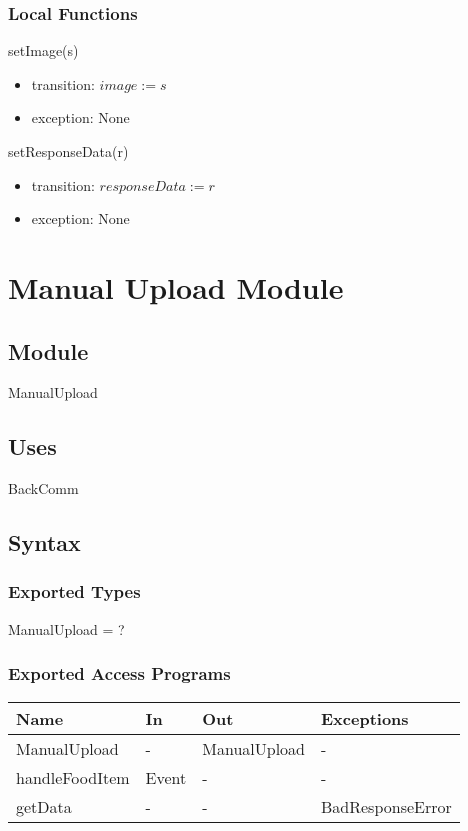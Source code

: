 \documentclass[12pt, titlepage]{article}
\begin{document}
\subsubsection{Local Functions}
\noindent setImage(s)
\begin{itemize}
	\item transition: $ image :=s $
	\item exception: None
\end{itemize}
\noindent setResponseData(r)
\begin{itemize}
	\item transition: $ responseData:=r $
	\item exception: None
\end{itemize}

\newpage

\section{Manual Upload Module} \label{ManualUpload}
\subsection{Module}
ManualUpload
\subsection{Uses}
BackComm
\subsection{Syntax}
\subsubsection{Exported Types}
ManualUpload = ?
\subsubsection{Exported Access Programs}
\begin{center}
	\begin{tabular}{p{3cm} p{4cm} p{4cm} p{2cm}}
		\hline
		\textbf{Name} & \textbf{In} & \textbf{Out} & \textbf{Exceptions} \\
		\hline
		ManualUpload & - & ManualUpload & - \\
		handleFoodItem & Event & - & - \\
		getData & - & - & BadResponseError \\
		\hline
	\end{tabular}
\end{center}
\end{document}
